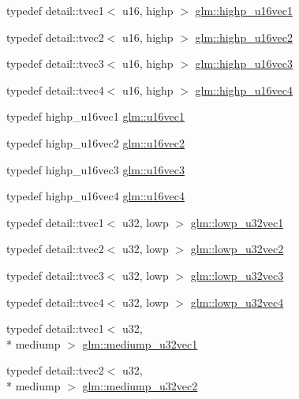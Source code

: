 \begin{DoxyCompactItemize}
typedef detail\-::tvec1$<$ u16, highp $>$ \hyperlink{group__gtc__type__precision_gac4a83dec879b77ab0055c8da232da066}{glm\-::highp\-\_\-u16vec1}
\item 
typedef detail\-::tvec2$<$ u16, highp $>$ \hyperlink{group__gtc__type__precision_gafad4245d389a4990eb505cd74a2d0a6f}{glm\-::highp\-\_\-u16vec2}
\item 
typedef detail\-::tvec3$<$ u16, highp $>$ \hyperlink{group__gtc__type__precision_gad98b30ad9bbfb79233340be3ba53ceb6}{glm\-::highp\-\_\-u16vec3}
\item 
typedef detail\-::tvec4$<$ u16, highp $>$ \hyperlink{group__gtc__type__precision_ga89074b108ec0643cffdfd008bedd3ffb}{glm\-::highp\-\_\-u16vec4}
\item 
typedef highp\-\_\-u16vec1 \hyperlink{group__gtc__type__precision_ga95324b9d781c51a6d31b05fcc63c5cbe}{glm\-::u16vec1}
\item 
typedef highp\-\_\-u16vec2 \hyperlink{group__gtc__type__precision_ga4beac509930099bb494b4bd0a44c49f2}{glm\-::u16vec2}
\item 
typedef highp\-\_\-u16vec3 \hyperlink{group__gtc__type__precision_ga372e1184da616b77fcbd48b8c166c24a}{glm\-::u16vec3}
\item 
typedef highp\-\_\-u16vec4 \hyperlink{group__gtc__type__precision_gaac02cce8820bcdbbeea9659aeaa718fb}{glm\-::u16vec4}
\item 
typedef detail\-::tvec1$<$ u32, lowp $>$ \hyperlink{group__gtc__type__precision_ga579d71c2ae1225b689aaab0bc7d33146}{glm\-::lowp\-\_\-u32vec1}
\item 
typedef detail\-::tvec2$<$ u32, lowp $>$ \hyperlink{group__gtc__type__precision_ga2f588e15c609987b89bd03f50b2a492d}{glm\-::lowp\-\_\-u32vec2}
\item 
typedef detail\-::tvec3$<$ u32, lowp $>$ \hyperlink{group__gtc__type__precision_ga53b6133cd2491fce1445c1744556b1bb}{glm\-::lowp\-\_\-u32vec3}
\item 
typedef detail\-::tvec4$<$ u32, lowp $>$ \hyperlink{group__gtc__type__precision_gaad6408408c9c5321cb6ee54f201de578}{glm\-::lowp\-\_\-u32vec4}
\item 
typedef detail\-::tvec1$<$ u32, \\*
mediump $>$ \hyperlink{group__gtc__type__precision_ga323fb0ed8f492d918b087226db2994f3}{glm\-::mediump\-\_\-u32vec1}
\item 
typedef detail\-::tvec2$<$ u32, \\*
mediump $>$ \hyperlink{group__gtc__type__precision_ga5d16ea7e110d8ba923ca347c16704f88}{glm\-::mediump\-\_\-u32vec2}

\end{DoxyCompactItemize}
